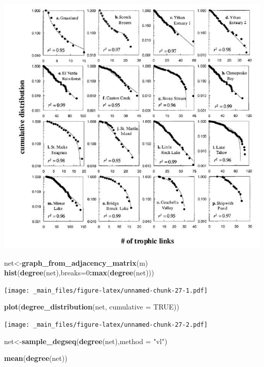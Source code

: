 \documentclass[
]{book}
\newenvironment{Shaded}{\begin{snugshade}}{\end{snugshade}}
\newcommand{\AttributeTok}[1]{\textcolor[rgb]{0.13,0.29,0.53}{#1}}
\newcommand{\ConstantTok}[1]{\textcolor[rgb]{0.56,0.35,0.01}{#1}}
\newcommand{\DecValTok}[1]{\textcolor[rgb]{0.00,0.00,0.81}{#1}}
\newcommand{\FunctionTok}[1]{\textcolor[rgb]{0.13,0.29,0.53}{\textbf{#1}}}
\newcommand{\NormalTok}[1]{#1}
\newcommand{\OtherTok}[1]{\textcolor[rgb]{0.56,0.35,0.01}{#1}}
\newcommand{\SpecialCharTok}[1]{\textcolor[rgb]{0.81,0.36,0.00}{\textbf{#1}}}
\newcommand{\StringTok}[1]{\textcolor[rgb]{0.31,0.60,0.02}{#1}}
\theoremstyle{definition}
\theoremstyle{definition}
\theoremstyle{definition}
\theoremstyle{definition}
\theoremstyle{remark}
\begin{document}
\includegraphics[width=9.33in]{fig06Networks/Dunne3}

\begin{Shaded}
\begin{Highlighting}[]
\NormalTok{net}\OtherTok{\textless{}{-}}\FunctionTok{graph\_from\_adjacency\_matrix}\NormalTok{(m)}
\FunctionTok{hist}\NormalTok{(}\FunctionTok{degree}\NormalTok{(net),}\AttributeTok{breaks=}\DecValTok{0}\SpecialCharTok{:}\FunctionTok{max}\NormalTok{(}\FunctionTok{degree}\NormalTok{(net)))}
\end{Highlighting}
\end{Shaded}

\texttt{[image: \_main\_files/figure-latex/unnamed-chunk-27-1.pdf]}

\begin{Shaded}
\begin{Highlighting}[]
\FunctionTok{plot}\NormalTok{(}\FunctionTok{degree\_distribution}\NormalTok{(net, }\AttributeTok{cumulative =} \ConstantTok{TRUE}\NormalTok{))}
\end{Highlighting}
\end{Shaded}

\texttt{[image: \_main\_files/figure-latex/unnamed-chunk-27-2.pdf]}

\begin{Shaded}
\begin{Highlighting}[]
\NormalTok{net}\OtherTok{\textless{}{-}}\FunctionTok{sample\_degseq}\NormalTok{(}\FunctionTok{degree}\NormalTok{(net),}\AttributeTok{method =} \StringTok{"vl"}\NormalTok{)}

\FunctionTok{mean}\NormalTok{(}\FunctionTok{degree}\NormalTok{(net))}
\end{Highlighting}
\end{Shaded}
\end{document}
